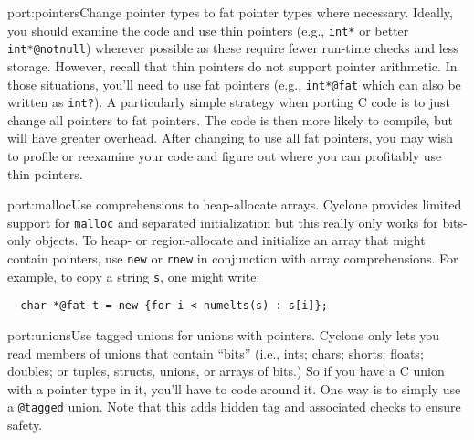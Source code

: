 \begin{porta}{port:pointers}{Change pointer types to fat pointer types where necessary.}  
Ideally, you should examine the code and use thin pointers (e.g., \texttt{int*}
or better \texttt{int*@notnull}) wherever possible as these require fewer
run-time checks and less storage.  However, recall that thin pointers
do not support pointer arithmetic.  In those situations, you'll need
to use fat pointers (e.g., \texttt{int*@fat} which can also be written
as \texttt{int?}).  A particularly simple strategy 
when porting C code is to just change all pointers to fat pointers.
The code is then more likely to compile, but will have greater overhead.
After changing to use all fat pointers, you may wish to profile or reexamine
your code and figure out where you can profitably use thin pointers.
\end{porta}

\begin{porta}{port:malloc}{Use comprehensions to heap-allocate arrays.}
Cyclone provides limited support for \texttt{malloc} and separated
initialization but this really only works for bits-only objects.
To heap- or region-allocate and initialize an array that might contain
pointers, use
\texttt{new} or \texttt{rnew} in conjunction with array comprehensions.  
For example, to copy a string \texttt{s}, one might write:
\begin{verbatim}
  char *@fat t = new {for i < numelts(s) : s[i]};
\end{verbatim}
\end{porta}

\begin{porta}{port:unions}{Use tagged unions for unions with pointers.}
Cyclone only lets you read members of unions that 
contain ``bits'' (i.e., ints; chars;
shorts; floats; doubles; or tuples, structs, unions, or arrays of bits.)
So if you have a C union with a pointer type in it, you'll have to
code around it.  One way is to simply use a \texttt{@tagged} union.
Note that this adds hidden tag and associated checks to ensure safety.
\end{porta}

